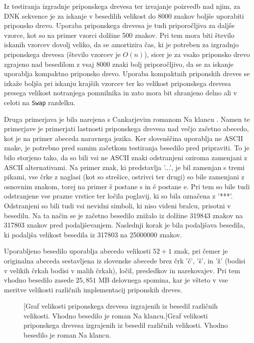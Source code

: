 Iz testiranja izgradnje priponskega drevesa ter izvajanje poizvedb nad njim, za DNK sekvence je za iskanje v besedilih velikost do 8000 znakov boljše uporabiti priponsko drevo. Uporaba priponskega drevesa je tudi priporočljiva za daljše vzorce, kot so na primer vzorci dolžine 500 znakov. Pri tem mora biti število iskanih vzorcev dovolj veliko, da se amortizira čas, ki je potreben za izgradnjo priponskega drevesa (število vzorcev je $O(n)$), sicer je za vsako priponsko drevo zgrajeno nad besedilom z vsaj 8000 znaki bolj priporočljivo, da se za iskanje uporablja kompaktno priponsko drevo. Uporaba kompaktnih priponskih dreves se izkaže boljša pri iskanju krajših vzorcev ter ko velikost priponskega drevesa presega velikost notranjega pomnilnika in zato mora bit shranjeno delno ali v celoti na \verb|Swap| razdelku.

Druga primerjava je bila narejena s Cankarjevim romanom Na klancu \cite{podatkiNaKlancu}. Namen te primerjave je primerjati lastnosti priponskega drevesa nad večjo začetno abecedo, kot je na primer abeceda naravnega jezika. Ker slovenščina uporablja ne ASCII znake, je potrebno pred samim začetkom testiranja besedilo pred pripraviti. To je bilo storjeno tako, da so bili vsi ne ASCII znaki odstranjeni oziroma zamenjani z ASCII alternativami. Na primer znak, ki predstavlja '...', je bil zamenjan s tremi pikami, vse črke z naglasi (kot so strešice, ostrivci ter drugi) so bile zamenjani z osnovnim znakom, torej na primer š postane s in é postane e. Pri tem so bile tudi odstranjene vse prazne vrstice ter ločila poglavij, ki so bila označena z '***'. Odstranjeni so bili tudi vsi nevidni simboli, ki niso videni bralcu, prisotni v besedilu. Na ta način se je začetno besedilo znižalo iz dolžine 319843 znakov na 317803 znakov pred podaljševanjem. Naslednji korak je bila podaljšava besedila, ki podaljša velikost besedila iz 317803 na 25000000 znakov.

Uporabljeno besedilo uporablja abecedo velikosti $52+1$ znak, pri čemer je originalna abeceda sestavljena iz slovenske abecede brez črk 'č', 'š', in 'ž' (bodisi v velikih črkah bodisi v malih črkah), ločil, presledkov in narekovajev. Pri tem vhodno besedilo zasede $25,851$ MB delovnega spomina, kar je všteto v vse meritve velikosti različnih implementacij priponskih dreves.

\begin{figure}[htb]
    
    [Graf velikosti priponskega drevesa izgrajenih iz besedil različnih velikosti. Vhodno besedilo je roman Na klancu.]{Graf velikosti priponskega drevesa izgrajenih iz besedil različnih velikosti. Vhodno besedilo je roman Na klancu.} 
    \label{fig:VelikostGrafSLO}
\end{figure}

